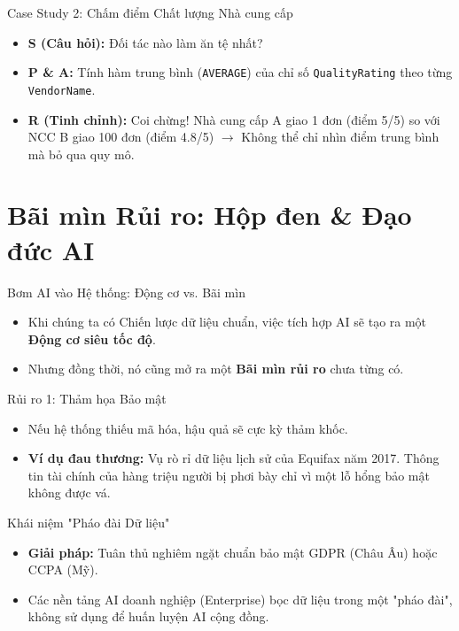 \documentclass[aspectratio=169,12pt]{beamer}
\begin{document}
\begin{frame}{Case Study 2: Chấm điểm Chất lượng Nhà cung cấp}
    \begin{itemize}
        \item \textbf{S (Câu hỏi):} Đối tác nào làm ăn tệ nhất?
        \item \textbf{P \& A:} Tính hàm trung bình (\texttt{AVERAGE}) của chỉ số \texttt{QualityRating} theo từng \texttt{VendorName}.
        \item \textbf{R (Tinh chỉnh):} Coi chừng! Nhà cung cấp A giao 1 đơn (điểm 5/5) so với NCC B giao 100 đơn (điểm 4.8/5) $\rightarrow$ Không thể chỉ nhìn điểm trung bình mà bỏ qua quy mô.
    \end{itemize}
\end{frame}


\section{Bãi mìn Rủi ro: Hộp đen \& Đạo đức AI}
\begin{frame}
    \tableofcontents[currentsection]
\end{frame}

\begin{frame}{Bơm AI vào Hệ thống: Động cơ vs. Bãi mìn}
    \begin{itemize}
        \item Khi chúng ta có Chiến lược dữ liệu chuẩn, việc tích hợp AI sẽ tạo ra một \textbf{Động cơ siêu tốc độ}.
        \item Nhưng đồng thời, nó cũng mở ra một \textbf{Bãi mìn rủi ro} chưa từng có.
    \end{itemize}
\end{frame}

\begin{frame}{Rủi ro 1: Thảm họa Bảo mật}
    \begin{itemize}
        \item Nếu hệ thống thiếu mã hóa, hậu quả sẽ cực kỳ thảm khốc.
        \item \textbf{Ví dụ đau thương:} Vụ rò rỉ dữ liệu lịch sử của Equifax năm 2017. Thông tin tài chính của hàng triệu người bị phơi bày chỉ vì một lỗ hổng bảo mật không được vá.
    \end{itemize}
\end{frame}

\begin{frame}{Khái niệm "Pháo đài Dữ liệu"}
    \begin{itemize}
        \item \textbf{Giải pháp:} Tuân thủ nghiêm ngặt chuẩn bảo mật GDPR (Châu Âu) hoặc CCPA (Mỹ).
        \item Các nền tảng AI doanh nghiệp (Enterprise) bọc dữ liệu trong một "pháo đài", không sử dụng để huấn luyện AI cộng đồng.
    \end{itemize}
\end{frame}
\end{document}
